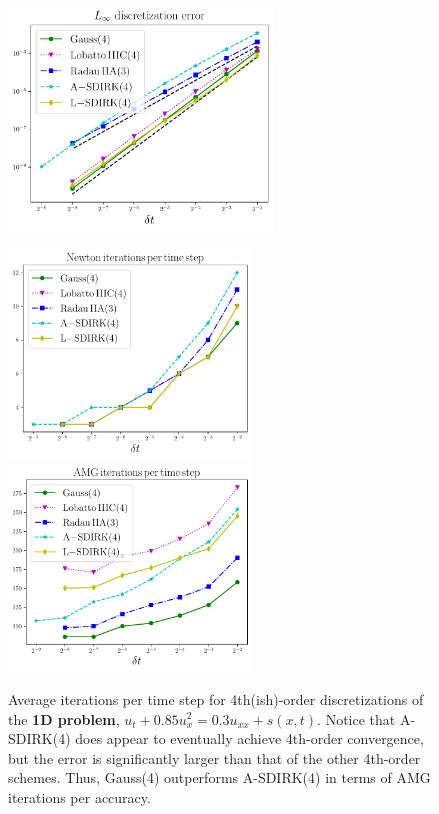 \documentclass[review]{siamart}
\begin{document}
\begin{figure}[H]
\centerline{
\includegraphics[width = 0.625\textwidth]{figures/errors_O4_dim1}
}
\centerline{
\includegraphics[width = 0.575\textwidth]{figures/newton_iters_O4_dim1}
\quad
\includegraphics[width = 0.575\textwidth]{figures/amg_iters_O4_dim1}
}
\caption{Average iterations per time step for 4th(ish)-order discretizations of the \textbf{1D problem}, $u_t + 0.85 u^2_x = 0.3u_{xx} + s(x,t)$. Notice that A-SDIRK(4) does appear to eventually achieve 4th-order convergence, but the error is significantly larger than that of the other 4th-order schemes. Thus, Gauss(4) outperforms A-SDIRK(4) in terms of AMG iterations per accuracy.
\label{fig:iters1D}
}
\end{figure}
\end{document}
